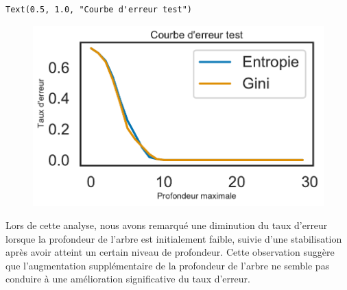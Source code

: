 \documentclass[
  letterpaper,
  DIV=11,
  numbers=noendperiod]{scrartcl}
\begin{document}
\begin{verbatim}
Text(0.5, 1.0, "Courbe d'erreur test")
\end{verbatim}

\begin{figure}[H]

{\centering \includegraphics{TP_files/figure-pdf/cell-8-output-2.pdf}

}

\end{figure}

Lors de cette analyse, nous avons remarqué une diminution du taux
d'erreur lorsque la profondeur de l'arbre est initialement faible,
suivie d'une stabilisation après avoir atteint un certain niveau de
profondeur. Cette observation suggère que l'augmentation supplémentaire
de la profondeur de l'arbre ne semble pas conduire à une amélioration
significative du taux d'erreur.
\end{document}
